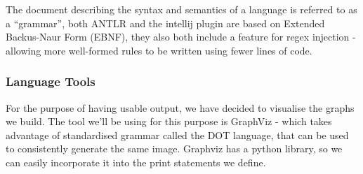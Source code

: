 The document describing the syntax and semantics of a language is referred to as a ``grammar''\cite{Grammars}, both
ANTLR and the intellij plugin are based on Extended Backus-Naur Form (EBNF), they also both include a feature for
regex injection - allowing more well-formed rules to be written using fewer lines of code.

\subsubsection{Language Tools}
For the purpose of having usable output, we have decided to visualise the graphs we build.
The tool we'll be using for this purpose is GraphViz\cite{GraphViz} - which takes advantage of standardised grammar
called the DOT language, that can be used to consistently generate the same image.
Graphviz has a python library, so we can easily incorporate it into the print statements we define.